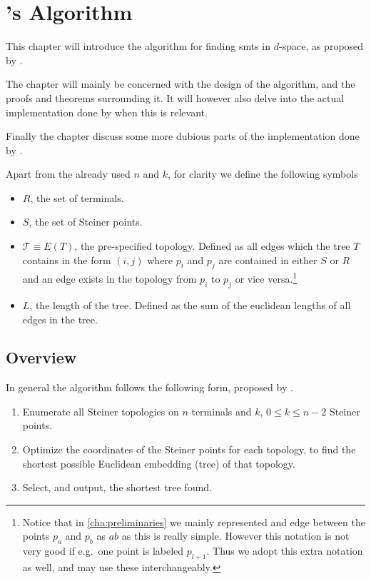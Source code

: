 { \abnormalparskip{0pt}
\chapter{\citeauthor{smith1992}'s Algorithm}
\label{cha:algorithm} }


This chapter will introduce the algorithm for finding \acp{smt} in
$d$-space, as proposed by \textcite{smith1992}.

The chapter will mainly be concerned with the design of the algorithm, and the
proofs and theorems surrounding it. It will however also delve into the actual
implementation done by \citeauthor{smith1992} when this is relevant.

Finally the chapter discuss some more dubious parts of the implementation done
by \citeauthor{smith1992}.

Apart from the already used $n$ and $k$, for clarity we define the following symbols
%
\begin{itemize}
\item $R$, the set of terminals.
\item $S$, the set of Steiner points.
\item $\mathcal{T} \equiv E(T)$, the pre-specified topology. Defined as all
  edges which the tree $T$ contains in the form $(i, j)$ where $p_i$ and
  $p_j$ are contained in either $S$ or $R$ and an edge exists in the
  topology from $p_i$ to $p_j$ or vice versa.\footnote{Notice that in
    \cref{cha:preliminaries} we mainly represented and edge between the points
    $p_a$ and $p_b$ as $ab$ as this is really simple. However this notation is not
    very good if e.g.\ one point is labeled $p_{l+1}$. Thus we adopt this extra
    notation as well, and may use these interchangeably.}
\item $L$, the length of the tree. Defined as the sum of the euclidean lengths
of all edges in the tree.
\end{itemize}

\section{Overview}
\label{sec:overview}

In general the algorithm follows the following form, proposed by \textcite{gilbert1968}.

\begin{enumerate}
\item Enumerate all Steiner topologies on $n$ terminals and $k$, $0 \le k \le
n-2$ Steiner points.
\item Optimize the coordinates of the Steiner points for each topology, to find
the shortest possible Euclidean embedding (tree) of that topology.
\item Select, and output, the shortest tree found.
\end{enumerate}

